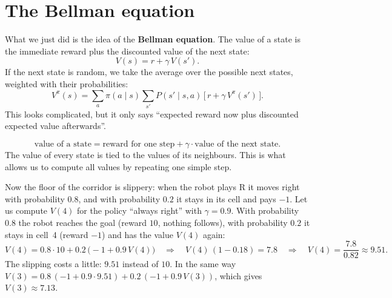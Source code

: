 \begin{center}
\label{fig:rl2_values}
\end{center}

\section*{The Bellman equation}
What we just did is the idea of the \textbf{Bellman equation}. The value of a state is the immediate reward plus the discounted value of the next state:
\[
V(s)=r+\gamma\,V(s').
\]
If the next state is random, we take the average over the possible next states, weighted with their probabilities:
\[
V^\pi(s)=\sum_{a}\pi(a\mid s)\sum_{s'}P(s'\mid s,a)\,\bigl[\,r+\gamma\,V^\pi(s')\,\bigr].
\]
This looks complicated, but it only says ``expected reward now plus discounted expected value afterwards''.

\begin{keyidea}
\[
\text{value of a state}=\text{reward for one step}+\gamma\cdot\text{value of the next state.}
\]
The value of every state is tied to the values of its neighbours. This is what allows us to compute all values by repeating one simple step.
\end{keyidea}

\begin{example}
Now the floor of the corridor is slippery: when the robot plays R it moves right with probability $0.8$, and with probability $0.2$ it stays in its cell and pays $-1$. Let us compute $V(4)$ for the policy ``always right'' with $\gamma=0.9$. With probability $0.8$ the robot reaches the goal (reward $10$, nothing follows), with probability $0.2$ it stays in cell~4 (reward $-1$) and has the value $V(4)$ again:
\[
V(4)=0.8\cdot10+0.2\,\bigl(-1+0.9\,V(4)\bigr)
\quad\Rightarrow\quad
V(4)\,(1-0.18)=7.8
\quad\Rightarrow\quad
V(4)=\frac{7.8}{0.82}\approx9.51 .
\]
The slipping costs a little: $9.51$ instead of $10$. In the same way $V(3)=0.8\,(-1+0.9\cdot9.51)+0.2\,(-1+0.9\,V(3))$, which gives $V(3)\approx7.13$.
\end{example}

